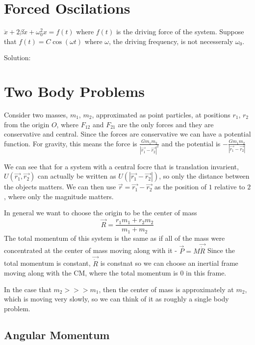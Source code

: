 \documentclass{homework}
\begin{document}
\section{Forced Oscilations}

$\ddot x + 2\beta \dot x + \omega_0^2 x = f(t)$ where $f(t)$ is the driving force of the system. Suppose that $f(t) = C \cos (\omega t)$ where $\omega$, the driving frequency, is not necesseraly $\omega_0$. 

Solution: 




\section{Two Body Problems}

Consider two masses, $m_1$, $m_2$, approximated as point particles, at positions $r_1$, $r_2$ from the origin $O$, where $F_{12}$ and $F_{21}$ are the only forces and they are conservative and central.
Since the forces are conservative we can have a potential function. For gravity, this means the force is $\frac{Gm_1m_2}{|\vec{r_1} - \vec{r_2}|^2}$ and the potential is  $-\frac{Gm_1m_2}{|\vec{r_1} - \vec{r_2}|}$

We can see that for a system with a central focre that is translation invarient, $U(\vec{r_1},\vec{r_2})$ can actually be written as $U(|\vec{r_1}-\vec{r_2}|)$, so only the distance between the objects matters. We can then use $\vec{r} = \vec{r_1} - \vec{r_2}$ as the position of $1$ relative to $2$, where only the magnitude matters.


In general we want to choose the origin to be the center of mass
\[\vec{R} = \frac{r_1m_1 + r_2m_2}{m_1 + m_2}\]
The total momentum of this system is the same as if all of the mass were concentrated at the center of mass moving along with it - $\vec{P} = M\vec{\dot R}$ Since the total momentum is constant, $\vec{\dot R}$ is constnat so we can choose an inertial frame moving along with the CM, where the total momentum is $0$ in this frame.

In the case that $m_2 >>> m_1$, then the center of mass is approximately at $m_2$, which is moving very slowly, so we can think of it as roughly a single body problem.

\subsection{Angular Momentum}
\end{document}
